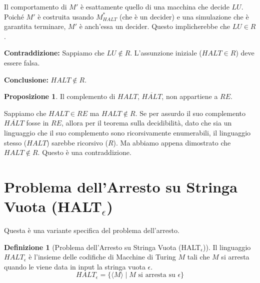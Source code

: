 \documentclass[a4paper]{article}
\makeatletter
\theoremstyle{definition} %
\newtheorem{definition}{Definizione}[section] %
\newtheorem{proposition}{Proposizione}[section]
\renewenvironment{proof}[1][\proofname]{\par
  \pushQED{\qed}%
  \normalfont \topsep6\p@\@plus6\p@\relax
  \trivlist
  \item[\hskip\labelsep
        \bfseries
    #1\@addpunct{.}]\ignorespaces
}{%
  \popQED\endtrivlist\@endpefalse
}
\makeatother
\begin{document}
\begin{proof}
Il comportamento di $M'$ è esattamente quello di una macchina che decide $LU$. Poiché $M'$ è costruita usando $M_{HALT}^*$ (che è un decider) e una simulazione che è garantita terminare, $M'$ è anch'essa un decider. Questo implicherebbe che $LU \in R$.

\textbf{Contraddizione:} Sappiamo che $LU \notin R$.
L'assunzione iniziale ($HALT \in R$) deve essere falsa.

\textbf{Conclusione:} $HALT \notin R$.
\end{proof}

\begin{proposition}
Il complemento di $HALT$, $\overline{HALT}$, non appartiene a $RE$.
\end{proposition}
\begin{proof}
Sappiamo che $HALT \in RE$ ma $HALT \notin R$. Se per assurdo il suo complemento $\overline{HALT}$ fosse in $RE$, allora per il teorema sulla decidibilità, dato che sia un linguaggio che il suo complemento sono ricorsivamente enumerabili, il linguaggio stesso ($HALT$) sarebbe ricorsivo ($R$). Ma abbiamo appena dimostrato che $HALT \notin R$. Questo è una contraddizione.
\end{proof}

\section{Problema dell'Arresto su Stringa Vuota (HALT$_\epsilon$)}
Questa è una variante specifica del problema dell'arresto.
\begin{definition}[Problema dell'Arresto su Stringa Vuota (HALT$_\epsilon$)]
Il linguaggio $HALT_\epsilon$ è l'insieme delle codifiche di Macchine di Turing $M$ tali che $M$ si arresta quando le viene data in input la stringa vuota $\epsilon$.
\[ HALT_\epsilon = \{ \langle M \rangle \mid M \text{ si arresta su } \epsilon \} \]
\end{definition}
\end{document}
